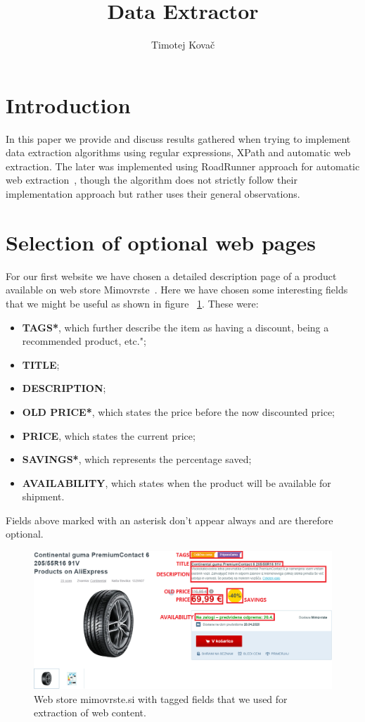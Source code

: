 \documentclass[9pt]{IEEEtran}
\title{\vspace{0ex}
Data Extractor}
\author{Timotej Kovač\vspace{-4.0ex}}
\begin{document}
\maketitle

\section{Introduction}

In this paper we provide and discuss results gathered when trying to implement data extraction algorithms using regular expressions, XPath and automatic web extraction.
The later was implemented using RoadRunner approach for automatic web extraction~\cite{roadrunner}, though the algorithm does not strictly follow their implementation approach but rather uses their general observations.


\section{Selection of optional web pages}

For our first website we have chosen a detailed description page of a product available on web store Mimovrste~\cite{mimovrste}.
Here we have chosen some interesting fields that we might be useful as shown in figure ~\ref{fig_mimovrste}.
These were:
\begin{itemize}
\item{\textbf{TAGS*}, which further describe the item as having a discount, being a recommended product, etc.";}
\item{\textbf{TITLE};}
\item{\textbf{DESCRIPTION};}
\item{\textbf{OLD PRICE*}, which states the price before the now discounted price;}
\item{\textbf{PRICE}, which states the current price;}
\item{\textbf{SAVINGS*}, which represents the percentage saved;}
\item{\textbf{AVAILABILITY}, which states when the product will be available for shipment.}
\end{itemize}
Fields above marked with an asterisk don't appear always and are therefore optional.

\begin{figure}[ht]
    \centering
    \includegraphics[width=1\columnwidth]{mimovrste.png}
    \caption{Web store mimovrste.si with tagged fields that we used for extraction of web content.}
    \label{fig_mimovrste}
\end{figure}
\end{document}
